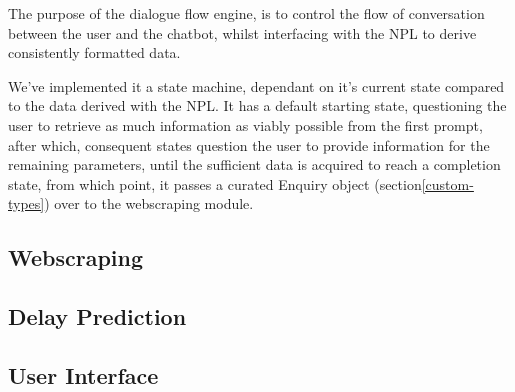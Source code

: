 \documentclass[11pt]{article}
\begin{document}
The purpose of the dialogue flow engine, is to control the flow of conversation between the user and the chatbot, whilst interfacing with the NPL to derive consistently formatted data.

We've implemented it a state machine, dependant on it's current state compared to the data derived with the NPL. It has a default starting state, questioning the user to retrieve as much information as viably possible from the first prompt, after which, consequent states question the user to provide information for the remaining parameters, until the sufficient data is acquired to reach a completion state, from which point, it passes a curated Enquiry object (section\ref{custom-types}) over to the webscraping module.



\subsection{Webscraping} \label{webscraping-design}


\subsection{Delay Prediction} \label{delay-prediction-design}


\subsection{User Interface} \label{user-interface-design}



 
\end{document}
